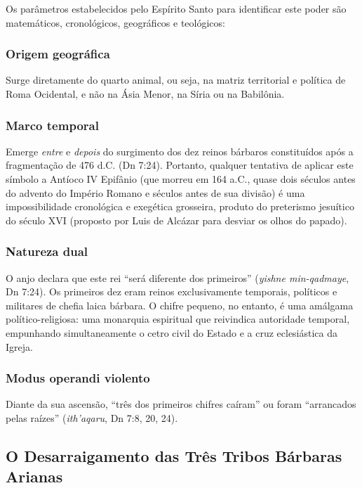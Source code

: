 \documentclass[11pt,a4paper,openany]{book}
\begin{document}
Os parâmetros estabelecidos pelo Espírito Santo para identificar este poder são matemáticos, cronológicos, geográficos e teológicos:

\subsubsection*{Origem geográfica}
Surge diretamente do quarto animal, ou seja, na matriz territorial e política de Roma Ocidental, e não na Ásia Menor, na Síria ou na Babilônia.

\subsubsection*{Marco temporal}
Emerge \textit{entre} e \textit{depois} do surgimento dos dez reinos bárbaros constituídos após a fragmentação de 476 d.C. (Dn 7:24). Portanto, qualquer tentativa de aplicar este símbolo a Antíoco IV Epifânio (que morreu em 164 a.C., quase dois séculos antes do advento do Império Romano e séculos antes de sua divisão) é uma impossibilidade cronológica e exegética grosseira, produto do preterismo jesuítico do século XVI (proposto por Luis de Alcázar para desviar os olhos do papado).

\subsubsection*{Natureza dual}
O anjo declara que este rei ``será diferente dos primeiros'' (\textit{yishne min-qadmaye}, Dn 7:24). Os primeiros dez eram reinos exclusivamente temporais, políticos e militares de chefia laica bárbara. O chifre pequeno, no entanto, é uma amálgama político-religiosa: uma monarquia espiritual que reivindica autoridade temporal, empunhando simultaneamente o cetro civil do Estado e a cruz eclesiástica da Igreja.

\subsubsection*{Modus operandi violento}
Diante da sua ascensão, ``três dos primeiros chifres caíram'' ou foram ``arrancados pelas raízes'' (\textit{ith'aqaru}, Dn 7:8, 20, 24).



\subsection{O Desarraigamento das Três Tribos Bárbaras Arianas}
\end{document}
